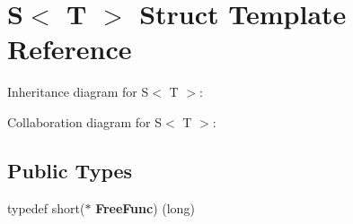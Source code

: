 \hypertarget{struct_s}{}\section{S$<$ T $>$ Struct Template Reference}
\label{struct_s}


Inheritance diagram for S$<$ T $>$\+:


Collaboration diagram for S$<$ T $>$\+:
\subsection*{Public Types}
\begin{DoxyCompactItemize}
\item 
\mbox{\label{struct_s_acec9e346c28cef468868cab6cdcac6f6}} 
typedef short($\ast$ {\bfseries Free\+Func}) (long)
\end{DoxyCompactItemize}
